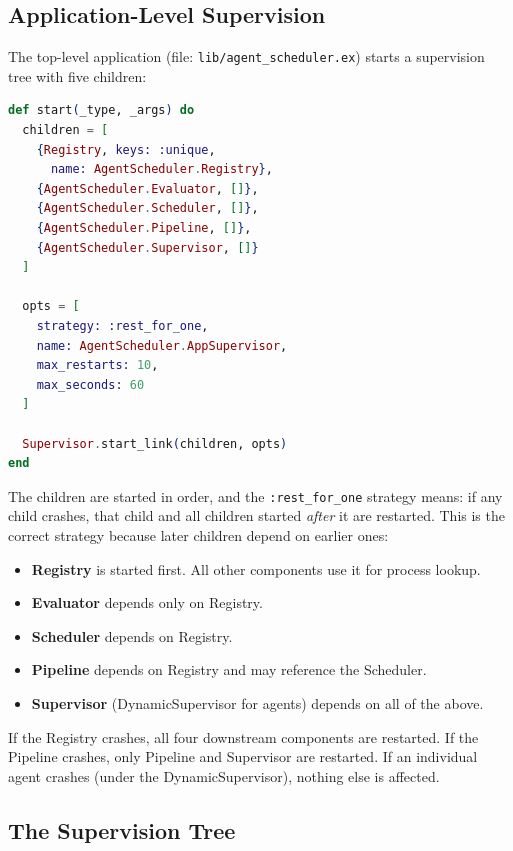 \documentclass[12pt,a4paper]{article}
\theoremstyle{definition}
\theoremstyle{remark}
\begin{document}
\subsection{Application-Level Supervision}

The top-level application (file: \texttt{lib/agent\_scheduler.ex}) starts a supervision tree with five children:

\begin{lstlisting}[language=elixir, caption={Application supervision tree (from \texttt{agent\_scheduler.ex})}, label={lst:application}]
def start(_type, _args) do
  children = [
    {Registry, keys: :unique,
      name: AgentScheduler.Registry},
    {AgentScheduler.Evaluator, []},
    {AgentScheduler.Scheduler, []},
    {AgentScheduler.Pipeline, []},
    {AgentScheduler.Supervisor, []}
  ]

  opts = [
    strategy: :rest_for_one,
    name: AgentScheduler.AppSupervisor,
    max_restarts: 10,
    max_seconds: 60
  ]

  Supervisor.start_link(children, opts)
end
\end{lstlisting}

The children are started in order, and the \texttt{:rest\_for\_one} strategy means: if any child crashes, that child and all children started \emph{after} it are restarted. This is the correct strategy because later children depend on earlier ones:

\begin{itemize}[leftmargin=2em]
  \item \textbf{Registry} is started first. All other components use it for process lookup.
  \item \textbf{Evaluator} depends only on Registry.
  \item \textbf{Scheduler} depends on Registry.
  \item \textbf{Pipeline} depends on Registry and may reference the Scheduler.
  \item \textbf{Supervisor} (DynamicSupervisor for agents) depends on all of the above.
\end{itemize}

If the Registry crashes, all four downstream components are restarted. If the Pipeline crashes, only Pipeline and Supervisor are restarted. If an individual agent crashes (under the DynamicSupervisor), nothing else is affected.

\subsection{The Supervision Tree}
\end{document}
